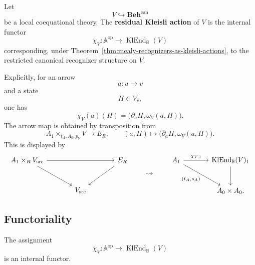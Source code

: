 \begin{definition}
\label{def:residual-kleisli-action}
    Let
    \[
        V\hookrightarrow\mathbf{Beh}^{\mathrm{can}}
    \]
    be a local coequational theory. The \textbf{residual Kleisli action} of
    \(V\) is the internal functor
    \[
        \chi_V:
        \mathbb A^{\mathrm{op}}
        \to
        \operatorname{KlEnd}_{\mathbb B}(V)
    \]
    corresponding, under
    Theorem~\ref{thm:mealy-recognizers-as-kleisli-actions}, to the restricted
    canonical recognizer structure on \(V\).
\end{definition}

Explicitly, for an arrow
\[
    a:u\to v
\]
and a state
\[
    H\in V_v,
\]
one has
\[
    \chi_V(a)(H)
    =
    \bigl(\partial_aH,\omega_V(a,H)\bigr).
\]
The arrow map is obtained by transposition from
\[
    A_1\times_{t_A,A_0,p_V}V
    \longrightarrow
    E_R,
    \qquad
    (a,H)\longmapsto
    \bigl(\partial_aH,\omega_V(a,H)\bigr).
\]
This is displayed by
\[
\begin{tikzcd}[column sep=large, row sep=large]
    A_1\times_R V_{\mathrm{src}}
        \arrow[rr]
        \arrow[dr]
    &&
    E_R
        \arrow[dl]
    \\
    &
    V_{\mathrm{src}}
    &
\end{tikzcd}
\qquad
\leadsto
\qquad
\begin{tikzcd}[column sep=large, row sep=large]
    A_1
        \arrow[r, "\chi_{V,1}"]
        \arrow[dr, "{(t_A,s_A)}"']
    &
    \operatorname{KlEnd}_{\mathbb B}(V)_1
        \arrow[d]
    \\
    &
    A_0\times A_0 .
\end{tikzcd}
\]

\subsection{Functoriality}
\label{subsec:residual-action-functoriality}

\begin{proposition}
\label{prop:residual-action-functorial}
    The assignment
    \[
        \chi_V:
        \mathbb A^{\mathrm{op}}
        \to
        \operatorname{KlEnd}_{\mathbb B}(V)
    \]
    is an internal functor.
\end{proposition}

